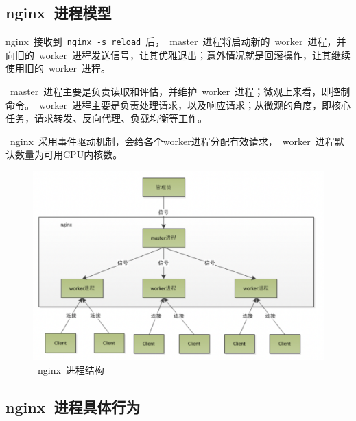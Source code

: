 \documentclass[12pt, a4paper]{article} %
\renewcommand{\figurename}{图} %
\begin{document}
\begin{CJK*}{UTF8}{gbsn}
\subsection{nginx~进程模型}
nginx~接收到~\verb|nginx -s reload|~后，~master~进程将启动新的~worker~进程，并向旧的~worker~进程发送信号，让其优雅退出；意外情况就是回滚操作，让其继续使用旧的~worker~进程。\par

~master~进程主要是负责读取和评估，并维护~worker~进程；微观上来看，即控制命令。~worker~进程主要是负责处理请求，以及响应请求；从微观的角度，即核心任务，请求转发、反向代理、负载均衡等工作。\par

~nginx~采用事件驱动机制，会给各个worker进程分配有效请求，~worker~进程默认数量为可用CPU内核数。\par

\renewcommand{\figurename}{图} %
\begin{figure}[htbp]
    \centering
    \includegraphics[width=1\textwidth]{./imgs/catch2023-08-19-10.37.16.png}
    \caption{~nginx~进程结构}
\end{figure}

\subsection{nginx~进程具体行为}


\end{CJK*}
\end{document}
